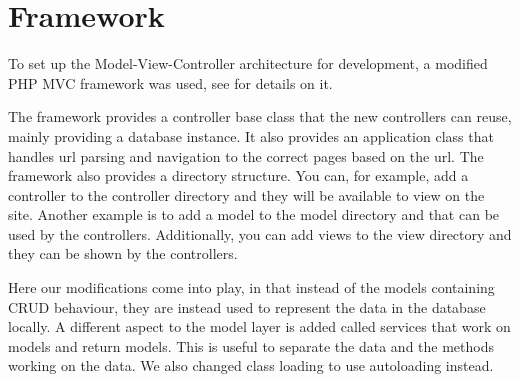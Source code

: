 \section{Framework}
To set up the Model-View-Controller architecture for development, a modified PHP MVC framework was used, see \citep{misc:mvc-framework} for details on it.

The framework provides a controller base class that the new controllers can reuse, mainly providing a database instance.
It also provides an application class that handles url parsing and navigation to the correct pages based on the url.
The framework also provides a directory structure. 
You can, for example, add a controller to the controller directory and they will be available to view on the site. 
Another example is to add a model to the model directory and that can be used by the controllers. 
Additionally, you can add views to the view directory and they can be shown by the controllers.

Here our modifications come into play, in that instead of the models containing CRUD behaviour, they are instead used to represent the data in the database locally.
A different aspect to the model layer is added called services that work on models and return models.
This is useful to separate the data and the methods working on the data.
We also changed class loading to use autoloading instead.